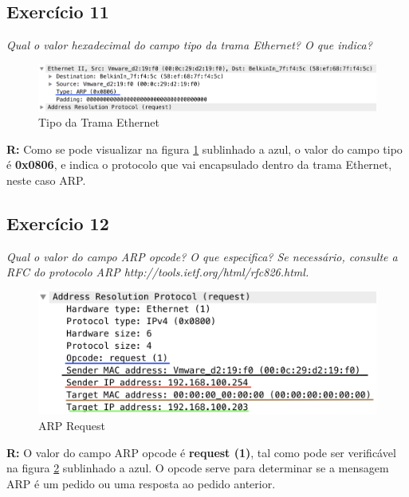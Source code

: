 \documentclass{llncs}
\begin{document}
\subsection{Exercício 11}
\emph{Qual o valor hexadecimal do campo tipo da trama Ethernet? O que indica?}

\begin{figure}[H]
\begin{center}
\includegraphics[scale=0.45]{11.png} 
\end{center}
\caption{\label{fig:11}Tipo da Trama Ethernet}
\end{figure} 
\par
\textbf{R:} Como se pode visualizar na figura \ref{fig:11} sublinhado a azul, o valor do campo tipo é \textbf{0x0806}, e indica o protocolo que vai encapsulado dentro da trama Ethernet, neste caso ARP.


\subsection{Exercício 12}
\emph{Qual o valor do campo ARP opcode? O que especifica? Se necessário, consulte a
RFC do protocolo ARP http://tools.ietf.org/html/rfc826.html.}

\begin{figure}[H]
\begin{center}
\includegraphics[scale=0.45]{12_13.png} 
\end{center}
\caption{\label{fig:12_13}ARP Request}
\end{figure} 
\par
\textbf{R:} O valor do campo ARP opcode é \textbf{request (1)}, tal como pode ser verificável na figura \ref{fig:12_13} sublinhado a azul. O opcode serve para determinar se a mensagem ARP é um pedido ou uma resposta ao pedido anterior. 
\end{document}
